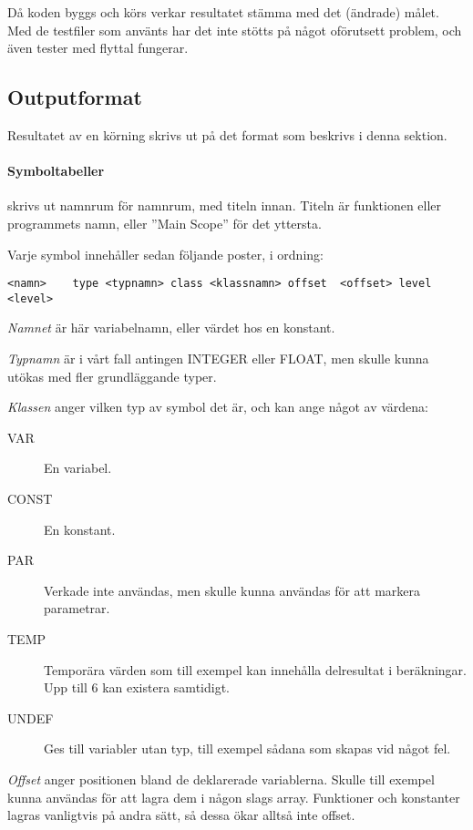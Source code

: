 	Då koden byggs och körs verkar resultatet stämma med det (ändrade) målet. Med de testfiler som använts har det inte stötts på något oförutsett problem, och även tester med flyttal fungerar.
	
	\subsection{Outputformat}
		
		Resultatet av en körning skrivs ut på det format som beskrivs i denna sektion. 
		
		\paragraph{Symboltabeller}
		skrivs ut namnrum för namnrum, med titeln innan. Titeln är funktionen eller programmets namn, eller ''Main Scope'' för det yttersta.
		
		Varje symbol innehåller sedan följande poster, i ordning:
\begin{verbatim}
<namn>    type <typnamn> class <klassnamn> offset  <offset> level  <level>
\end{verbatim}
		
		\textit{Namnet} är här variabelnamn, eller värdet hos en konstant. 
		
		\textit{Typnamn} är i vårt fall antingen INTEGER eller FLOAT, men skulle kunna utökas med fler grundläggande typer. 
		
		\textit{Klassen} anger vilken typ av symbol det är, och kan ange något av värdena:
		\begin{small}
		\begin{description}
		\item[VAR] En variabel.
		\item[CONST] En konstant.
		\item[PAR] Verkade inte användas, men skulle kunna användas för att markera parametrar.
		\item[TEMP] Temporära värden som till exempel kan innehålla delresultat i beräkningar. Upp till 6 kan existera samtidigt.
		\item[UNDEF] Ges till variabler utan typ, till exempel sådana som skapas vid något fel.
		\end{description}
		\end{small}
		
		\textit{Offset} anger positionen bland de deklarerade variablerna. Skulle till exempel kunna användas för att lagra dem i någon slags array. Funktioner och konstanter lagras vanligtvis på andra sätt, så dessa ökar alltså inte offset.
		
